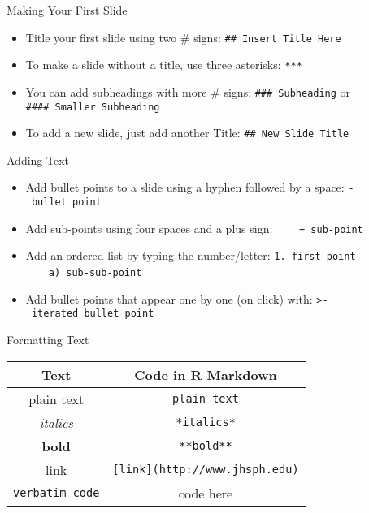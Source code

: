 \documentclass[
  ignorenonframetext,
]{beamer}
\providecommand{\tightlist}{%
  \setlength{\itemsep}{0pt}\setlength{\parskip}{0pt}}
\begin{document}
\begin{frame}[fragile]{Making Your First Slide}
\protect\hypertarget{making-your-first-slide}{}

\begin{itemize}
\tightlist
\item
  Title your first slide using two \# signs:
  \texttt{\#\#\ Insert\ Title\ Here}
\item
  To make a slide without a title, use three asterisks: \texttt{***}
\item
  You can add subheadings with more \# signs:
  \texttt{\#\#\#\ Subheading} or \texttt{\#\#\#\#\ Smaller\ Subheading}
\item
  To add a new slide, just add another Title:
  \texttt{\#\#\ New\ Slide\ Title}
\end{itemize}

\end{frame}

\begin{frame}[fragile]{Adding Text}
\protect\hypertarget{adding-text}{}

\begin{itemize}
\tightlist
\item
  Add bullet points to a slide using a hyphen followed by a space:
  \texttt{-\ bullet\ point}
\item
  Add sub-points using four spaces and a plus sign:
  ~~~~\texttt{+\ sub-point}
\item
  Add an ordered list by typing the number/letter:
  \texttt{1.\ first\ point} ~~~~\texttt{a)\ sub-sub-point}
\item
  Add bullet points that appear one by one (on click) with:
  \texttt{\textgreater{}-\ iterated\ bullet\ point}
\end{itemize}

\end{frame}

\begin{frame}[fragile]{Formatting Text}
\protect\hypertarget{formatting-text}{}

\begin{longtable}[]{@{}cc@{}}
\toprule
Text & Code in R Markdown\tabularnewline
\midrule
\endhead
plain text & \texttt{plain\ text}\tabularnewline
\emph{italics} & \texttt{*italics*}\tabularnewline
\textbf{bold} & \texttt{**bold**}\tabularnewline
\href{http://www.jhsph.edu}{link} &
\texttt{{[}link{]}(http://www.jhsph.edu)}\tabularnewline
\texttt{verbatim\ code} & \texttt{}code here\texttt{}\tabularnewline
\bottomrule
\end{longtable}

\end{frame}
\end{document}
